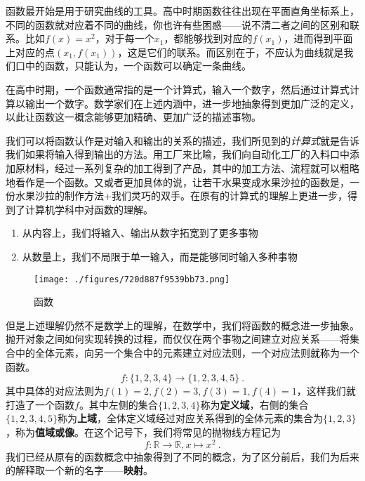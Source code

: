 

\begin{issues}
\issueDraft
\issueTODO
\end{issues}


函数最开始是用于研究曲线的工具。高中时期函数往往出现在平面直角坐标系上，不同的函数就对应着不同的曲线，你也许有些困惑——说不清二者之间的区别和联系。比如$f(x)=x^2$，对于每一个$x_1$，都能够找到对应的$f(x_1)$，进而得到平面上对应的点$(x_1,f(x_1))$，这是它们的联系。而区别在于，不应认为曲线就是我们口中的函数，只能认为，一个函数可以确定一条曲线。

在高中时期，一个函数通常指的是一个计算式，输入一个数字，然后通过计算式计算以输出一个数字。数学家们在上述内涵中，进一步地抽象得到更加广泛的定义，以此让函数这一概念能够更加精确、更加广泛的描述事物。

我们可以将函数认作是对输入和输出的关系的描述，我们所见到的\textsl{计算式}就是告诉我们如果将输入得到输出的方法。用工厂来比喻，我们向自动化工厂的入料口中添加原材料，经过一系列复杂的加工得到了产品，其中的加工方法、流程就可以粗略地看作是一个函数。又或者更加具体的说，让若干水果变成水果沙拉的函数是，一份水果沙拉的制作方法+我们灵巧的双手。在原有的计算式的理解上更进一步，得到了计算机学科中对函数的理解。
\begin{enumerate}
\item 从内容上，我们将输入、输出从数字拓宽到了更多事物
\item 从数量上，我们不局限于单一输入，而是能够同时输入多种事物
\end{enumerate}


\begin{figure}[ht]
\centering
\texttt{[image: ./figures/720d887f9539bb73.png]}
\caption{函数} \label{fig_functi_1}
\end{figure}

但是上述理解仍然不是数学上的理解，在数学中，我们将函数的概念进一步抽象。抛开对象之间如何实现转换的过程，而仅仅在两个事物之间建立对应关系——将集合中的全体元素，向另一个集合中的元素建立对应法则，一个对应法则就称为一个函数。
$$f:\{1,2,3,4\}\to\{1,2,3,4,5\}~.$$
其中具体的对应法则为$f(1)=2,f(2)=3,f(3)=1,f(4)=1$，这样我们就打造了一个函数$f$。其中左侧的集合$\{1,2,3,4\}$称为\textbf{定义域}，右侧的集合$\{1,2,3,4,5\}$称为\textbf{上域}，全体定义域经过对应关系得到的全体元素的集合为$\{1,2,3\}$，称为\textbf{值域或像}。在这个记号下，我们将常见的抛物线方程记为
\begin{equation}
f:\mathbb{R}\to{\mathbb{R}},x\mapsto{x^2}~.
\end{equation}
我们已经从原有的函数概念中抽象得到了不同的概念，为了区分前后，我们为后来的解释取一个新的名字——\textbf{映射}。

